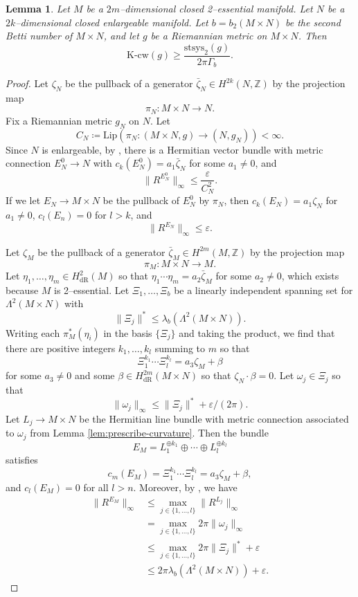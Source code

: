 \documentclass[12pt]{amsart}
\newtheorem{lemma}[theorem]{Lemma}
\theoremstyle{definition}
\numberwithin{equation}{section}
\newcommand{\Z}{\mathbb{Z}}
\newcommand{\eps}{\varepsilon}
\newcommand{\kcw}{\mathrm{K}\text{-}\mathrm{cw}}
\begin{document}
\begin{lemma}\label{lem:cw-gen-prod}
Let $M$ be a $2m$--dimensional closed 2--essential manifold. Let $N$ be a $2k$--dimensional closed enlargeable manifold. Let $b = b_2(M \times N)$ be the second Betti number of $M \times N$, and let $g$ be a Riemannian metric on $M \times N$. Then
\[ \kcw(g) \geq \frac{\mathrm{stsys}_2(g)}{2\pi \Gamma_b}. \]
\end{lemma}
\begin{proof}
Let $\zeta_N$ be the pullback of a generator $\bar{\zeta}_N \in H^{2k}(N, \Z)$ by the projection map
\[ \pi_N: M \times N \to N. \]
Fix a Riemannian metric $g_N$ on $N$. Let
\[ C_N \coloneq \mathrm{Lip}(\pi_N : (M \times N, g) \to (N, g_N)) < \infty. \]
Since $N$ is enlargeable, by \cite{Gromov-Lawson:closed}, there is a Hermitian vector bundle with metric connection $E_N^0 \to N$ with $c_k(E_N^0) = a_1 \bar{\zeta}_N$ for some $a_1 \neq 0$, and
\[ \|R^{E_N^0}\|_{\infty} \leq \frac{\eps}{C_N^2}. \]
If we let $E_N \to M \times N$ be the pullback of $E_N^0$ by $\pi_N$, then $c_k(E_N) = a_1 \zeta_N$ for $a_1 \neq 0$, $c_l(E_n) = 0$ for $l > k$, and
\[ \|R^{E_N}\|_{\infty} \leq \eps. \]

Let $\zeta_M$ be the pullback of a generator $\bar{\zeta}_M \in H^{2m}(M, \Z)$ by the projection map
\[ \pi_M : M \times N \to M. \]
Let $\eta_1, \hdots, \eta_m \in H^2_{\mathrm{dR}}(M)$ so that $\eta_1 \cdots \eta_m = a_2 \bar{\zeta}_M$ for some $a_2 \neq 0$, which exists because $M$ is 2--essential.
Let $\Xi_1, \hdots, \Xi_b$ be a linearly independent spanning set for $\Lambda^2(M \times N)$ with
\[ \|\Xi_j\|^* \leq \lambda_b(\Lambda^2(M\times N)). \]
Writing each $\pi_M^*(\eta_i)$ in the basis $\{\Xi_j\}$ and taking the product, we find that there are positive integers $k_1, \hdots, k_l$ summing to $m$ so that
\[ \Xi_1^{k_1} \cdots \Xi_l^{k_l} = a_3\zeta_M + \beta \]
for some $a_3 \neq 0$ and some $\beta \in H^{2m}_{\mathrm{dR}}(M \times N)$ so that $\zeta_N \cdot \beta = 0$. Let $\omega_j \in \Xi_j$ so that
\[ \|\omega_j\|_{\infty} \leq \|\Xi_j\|^* + \eps/(2\pi). \]
Let $L_j \to M \times N$ be the Hermitian line bundle with metric connection associated to $\omega_j$ from Lemma \ref{lem:prescribe-curvature}. Then the bundle
\[ E_M = L_1^{\oplus k_1} \oplus \cdots \oplus L_l^{\oplus k_l} \]
satisfies
\[ c_m(E_M) = \Xi_1^{k_1}\cdots \Xi_l^{k_l} = a_3\zeta_M + \beta, \]
and $c_l(E_M) = 0$ for all $l > n$. Moreover, by \cite[\S4, Page 18]{Gromov:K-area}, we have
\begin{align*}
\|R^{E_M}\|_{\infty}
& \leq \max_{j \in \{1, \hdots, l\}} \|R^{L_j}\|_{\infty}\\
& = \max_{j \in \{1, \hdots, l\}} 2\pi\|\omega_j\|_{\infty}\\
& \leq \max_{j \in \{1, \hdots, l\}} 2\pi\|\Xi_j\|^* + \eps\\
& \leq 2\pi\lambda_b(\Lambda^2(M \times N)) + \eps.
\end{align*}


\end{proof}
\end{document}
